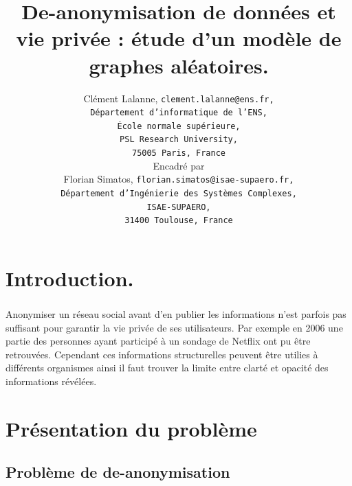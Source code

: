 \documentclass[11pt]{beamer}
\title{De-anonymisation de données et vie privée : étude d'un modèle de graphes aléatoires.}
\author{
  Clément Lalanne, \texttt{clement.lalanne@ens.fr, \\ D\'epartement d'informatique de l'ENS,\\ \'Ecole normale sup\'erieure,\\ PSL Research University,\\ 75005 Paris, France}
\\ Encadré par 
\\ Florian Simatos, \texttt{florian.simatos@isae-supaero.fr, \\ D\'epartement d'Ing\'enierie des Systèmes Complexes, \\ ISAE-SUPAERO, \\ 31400 Toulouse, France}
}
\date{}
\begin{document}
\def\vdep{\succ}
\def\dep{\rightarrow}
\def\deparrow#1{\lower 2 pt \hbox{$~\stackrel{#1}{\longrightarrow}~$}}
\def\anydep{\leadsto}
\def\ivdep{\vdep^*}
\def\idep{\rightarrow^*}
\def\ideparrow#1{\lower 2 pt \hbox{$~\stackrel{#1}{\longrightarrow}${${}^*$~}}}
\def\ianydep{\leadsto^*}


\newtheorem*{theoreme}{Théorème}
\newtheorem*{defi}{Définition}
\newtheorem*{proposition}{Proposition}
\newtheorem*{preuve}{Preuve}
\newtheorem*{lemme}{Lemme}
\newtheorem*{remarque}{Remarque}
\def\card{\mathop{\rm card}}


\begin{frame}
\titlepage
\vspace{-2cm}
\end{frame}

\section*{Introduction.}

\begin{frame}
\frametitle{\insertsection}
Anonymiser un réseau social avant d'en publier les informations n'est parfois pas suffisant pour garantir la vie privée de ses utilisateurs. Par exemple en 2006 une partie des personnes ayant participé à un sondage de Netflix ont pu être retrouvées. Cependant ces informations structurelles peuvent être utilies à différents organismes ainsi il faut trouver la limite entre clarté et opacité des informations révélées.
\end{frame}

\begin{frame}
	\frametitle{\insertsection}
	\tableofcontents[hideothersubsections]
\end{frame}

\section{Présentation du problème}

\subsection{Problème de de-anonymisation}
\end{document}
